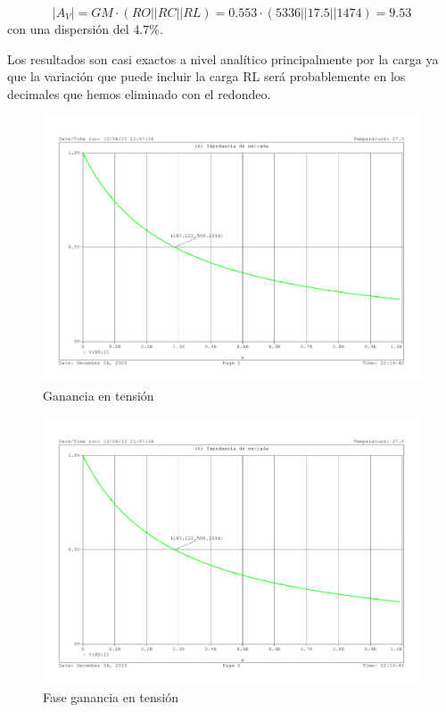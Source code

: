 \[|A_V| = GM \cdot (RO||RC||RL) = 0.553 \cdot (5336||17.5||1474) =
  9.53 \]
con una dispersión del $4.7\%$.

Los resultados son casi exactos a nivel analítico principalmente por
la carga ya que la variación que puede incluir la carga RL será
probablemente en los decimales que hemos eliminado con el redondeo.
\begin{figure}[H]
    \centering  
    \includegraphics[scale=0.45,page=2,trim]{images/problema_puntuable_5.pdf}
    \caption{Ganancia en tensión}
  \end{figure}

  \begin{figure}[H]
    \centering  
        \includegraphics[scale=0.45,page=3,trim]{images/problema_puntuable_5.pdf}
    \caption{Fase ganancia en tensión}
  \end{figure}

